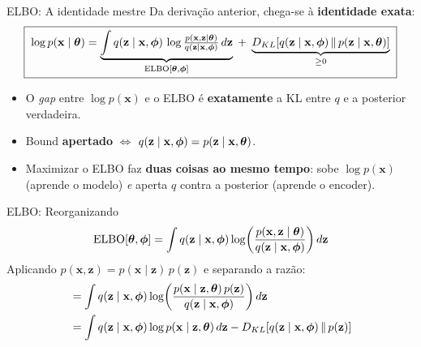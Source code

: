 \documentclass[aspectratio=169,xcolor=dvipsnames]{beamer}
\begin{document}
  \begin{frame}{ELBO: A identidade mestre}
    Da derivação anterior, chega-se à \textbf{identidade exata}:
    \vspace{0.3em}
    \[
      \boxed{\;\log p(\mathbf{x}\mid\bm{\theta})
        = \underbrace{\int q(\mathbf{z}\mid \mathbf{x},\bm{\phi})\,\log \tfrac{p(\mathbf{x},\mathbf{z}\mid\bm{\theta})}{q(\mathbf{z}\mid \mathbf{x},\bm{\phi})}\, d\mathbf{z}}_{\mathrm{ELBO}[\bm{\theta},\bm{\phi}]}
        \;+\; \underbrace{D_{KL}\!\left[q(\mathbf{z}\mid \mathbf{x},\bm{\phi})\,\|\,p(\mathbf{z}\mid \mathbf{x},\bm{\theta})\right]}_{\geq 0}\;}
    \]
    \vspace{0.2em}
    \begin{itemize}
      \item O \emph{gap} entre $\log p(\mathbf{x})$ e o ELBO é \textbf{exatamente}
      a KL entre $q$ e a posterior verdadeira.
      \item Bound \textbf{apertado} $\Leftrightarrow$ $q(\mathbf{z}\mid \mathbf{x},\bm{\phi})
      = p(\mathbf{z}\mid \mathbf{x},\bm{\theta})$.
      \item Maximizar o ELBO faz \textbf{duas coisas ao mesmo tempo}:
      sobe $\log p(\mathbf{x})$ (aprende o modelo) \emph{e} aperta $q$ contra a
      posterior (aprende o encoder).
    \end{itemize}
  \end{frame}

  \begin{frame}{ELBO: Reorganizando}
    \[
      \mathrm{ELBO}[\bm{\theta}, \bm{\phi}] =
      \int q(\mathbf{z} \mid \mathbf{x},\bm{\phi}) \log\!\left(\frac{p(\mathbf{x}, \mathbf{z} \mid \bm{\theta})}{q(\mathbf{z} \mid \mathbf{x},\bm{\phi})}\right) d\mathbf{z}
    \]
    \vspace{0.2em}
    Aplicando $p(\mathbf{x}, \mathbf{z}) = p(\mathbf{x} \mid \mathbf{z})\,p(\mathbf{z})$ e separando a razão:
    \begin{align*}
      &= \int q(\mathbf{z} \mid \mathbf{x},\bm{\phi}) \log\!\left(\frac{p(\mathbf{x} \mid \mathbf{z}, \bm{\theta})\,p(\mathbf{z})}{q(\mathbf{z} \mid \mathbf{x},\bm{\phi})}\right) d\mathbf{z} \\
      &= \int q(\mathbf{z} \mid \mathbf{x},\bm{\phi}) \log p(\mathbf{x} \mid \mathbf{z}, \bm{\theta})\, d\mathbf{z}
      - D_{KL}\!\left[q(\mathbf{z} \mid \mathbf{x},\bm{\phi})\,\|\,p(\mathbf{z})\right]
    \end{align*}
  \end{frame}
\end{document}
